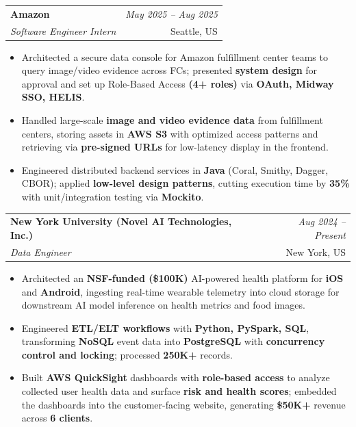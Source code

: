 \documentclass[a4paper,10pt]{article}
\makeatletter
\newcommand{\resumeSubheading}[4]{
\vspace{0.3mm}\item
    \begin{tabular*}{0.98\textwidth}[t]{l@{\extracolsep{\fill}}r}
        \textbf{#1} & \textit{\footnotesize{#4}} \\
        \textit{\footnotesize{#3}} & \footnotesize{#2}\\
    \end{tabular*}\vspace{-2mm}
}
\newcommand{\resumeItemListStart}{\begin{itemize}[leftmargin=*, labelsep=1mm, itemsep=0pt]}
\newcommand{\resumeItemListEnd}{\end{itemize}\vspace{-2mm}}
\makeatother
\begin{document}
\resumeSubheading
{Amazon}{Seattle, US}
{Software Engineer Intern}{May 2025 -- Aug 2025}
\resumeItemListStart
\item \footnotesize{Architected a secure data console for Amazon fulfillment center teams to query image/video evidence across FCs; presented \textbf{system design} for approval and set up Role-Based Access \textbf{(4+ roles)} via \textbf{OAuth, Midway SSO, HELIS}.}
\item \footnotesize{Handled large-scale \textbf{image and video evidence data} from fulfillment centers, storing assets in \textbf{AWS S3} with optimized access patterns and retrieving via \textbf{pre-signed URLs} for low-latency display in the frontend.}
\item \footnotesize{Engineered distributed backend services in \textbf{Java} (Coral, Smithy, Dagger, CBOR); applied \textbf{low-level design patterns}, cutting execution time by \textbf{35\%} with unit/integration testing via \textbf{Mockito}.}
\resumeItemListEnd

\resumeSubheading
{New York University (Novel AI Technologies, Inc.)}{New York, US}
{Data Engineer}{Aug 2024 -- Present}
\resumeItemListStart
\item \footnotesize{Architected an \textbf{NSF-funded (\$100K)} AI-powered health platform for \textbf{iOS} and \textbf{Android}, ingesting real-time wearable telemetry into cloud storage for downstream AI model inference on health metrics and food images.}
\item \footnotesize{Engineered \textbf{ETL/ELT workflows} with \textbf{Python, PySpark, SQL}, transforming \textbf{NoSQL} event data into \textbf{PostgreSQL} with \textbf{concurrency control and locking}; processed \textbf{250K+} records.}
\item \footnotesize{Built \textbf{AWS QuickSight} dashboards with \textbf{role-based access} to analyze collected user health data and surface \textbf{risk and health scores}; embedded the dashboards into the customer-facing website, generating \textbf{\$50K+} revenue across \textbf{6 clients}.}
\resumeItemListEnd
\end{document}

